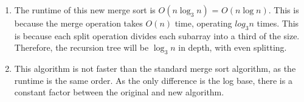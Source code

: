 \documentclass{article}
\begin{document}
\begin{enumerate}[label=\alph*.]
\begin{algorithm}
    \end{algorithm}
    \item The runtime of this new merge sort is $O(n\log_3 n)$ = $O(n\log n)$.
        This is because the merge operation takes $O(n)$ time, operating $log_3 n$ times.
        This is because each split operation divides each subarray into a third of the size.
        Therefore, the recursion tree will be $\log_3 n$ in depth, with even splitting.
    \item This algorithm is not faster than the standard merge sort algorithm,
        as the runtime is the same order.
        As the only difference is the log base, there is a constant factor between the original and new algorithm.
\end{enumerate}
\end{document}
